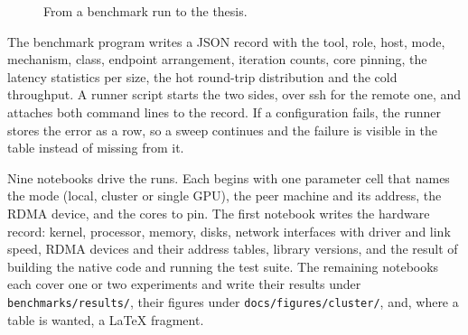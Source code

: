 \begin{figure}[htbp]
  \centering
  \caption[From a benchmark run to the thesis]{From a benchmark run to the thesis.}
  \label{fig:collection}
\end{figure}

The benchmark program writes a JSON record with the tool, role, host, mode,
mechanism, class, endpoint arrangement, iteration counts, core pinning, the
latency statistics per size, the hot round-trip distribution and the cold
throughput. A runner script starts the two sides, over ssh for the remote one,
and attaches both command lines to the record. If a configuration fails, the
runner stores the error as a row, so a sweep continues and the failure is
visible in the table instead of missing from it.

Nine notebooks drive the runs. Each begins with one parameter cell that names
the mode (local, cluster or single GPU), the peer machine and its address, the
RDMA device, and the cores to pin. The first notebook writes the hardware
record: kernel, processor, memory, disks, network interfaces with driver and
link speed, RDMA devices and their address tables, library versions, and the
result of building the native code and running the test suite. The remaining
notebooks each cover one or two experiments and write their results under
\nolinkurl{benchmarks/results/}, their figures under
\nolinkurl{docs/figures/cluster/}, and, where a table is wanted, a LaTeX
fragment.

